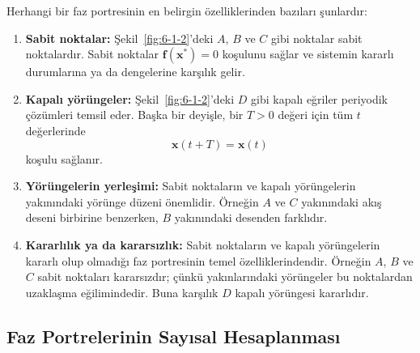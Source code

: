 \begin{justify}
Herhangi bir faz portresinin en belirgin özelliklerinden bazıları şunlardır:
\begin{enumerate}
\item \textbf{Sabit noktalar:} Şekil~\ref{fig:6-1-2}'deki $A$, $B$ ve $C$ gibi noktalar sabit noktalardır. Sabit noktalar $\mathbf{f}(\mathbf{x}^{*})=0$ koşulunu sağlar ve sistemin kararlı durumlarına ya da dengelerine karşılık gelir.
\item \textbf{Kapalı yörüngeler:} Şekil~\ref{fig:6-1-2}'deki $D$ gibi kapalı eğriler periyodik çözümleri temsil eder. Başka bir deyişle, bir $T>0$ değeri için tüm $t$ değerlerinde
\begin{equation}
\mathbf{x}(t+T)=\mathbf{x}(t)
\end{equation}
koşulu sağlanır.
\item \textbf{Yörüngelerin yerleşimi:} Sabit noktaların ve kapalı yörüngelerin yakınındaki yörünge düzeni önemlidir. Örneğin $A$ ve $C$ yakınındaki akış deseni birbirine benzerken, $B$ yakınındaki desenden farklıdır.
\item \textbf{Kararlılık ya da kararsızlık:} Sabit noktaların ve kapalı yörüngelerin kararlı olup olmadığı faz portresinin temel özelliklerindendir. Örneğin $A$, $B$ ve $C$ sabit noktaları kararsızdır; çünkü yakınlarındaki yörüngeler bu noktalardan uzaklaşma eğilimindedir. Buna karşılık $D$ kapalı yörüngesi kararlıdır.
\end{enumerate}
\end{justify}

\subsection*{Faz Portrelerinin Sayısal Hesaplanması}
{}

